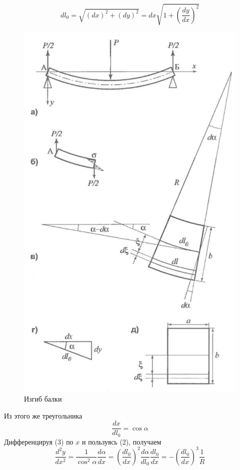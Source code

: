 \documentclass[a4paper,12pt]{article} %
\begin{document}
\begin{equation}
dl_0 = \sqrt{(dx)^2+(dy)^2} = dx\sqrt{1 + \left(\frac{dy}{dx}\right)^2}
\end{equation}
\newpage
\begin{figure}[h]
\centering
\includegraphics[scale=0.5]{3}
\caption{Изгиб балки}
\end{figure}
Из этого же треугольника 
\begin{equation}
\frac{dx}{dl_0} = \cos\alpha
\end{equation}
Дифференцируя (3) по $x$ и пользуясь (2), получаем
\begin{equation}
\frac{d^2y}{dx^2} = \frac{1}{\cos^2\alpha}\frac{d\alpha}{dx} = \left(\frac{dl_0}{dx}\right)^2 \frac{d\alpha}{dl_0}\frac{dl_0}{dx} = - \left(\frac{dl_0}{dx}\right)^3\frac{1}{R}
\end{equation}
\end{document}
